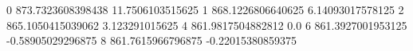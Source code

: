 0 873.7323608398438 11.7506103515625
1 868.1226806640625 6.14093017578125
2 865.1050415039062 3.123291015625
4 861.9817504882812 0.0
6 861.3927001953125 -0.58905029296875
8 861.7615966796875 -0.22015380859375
